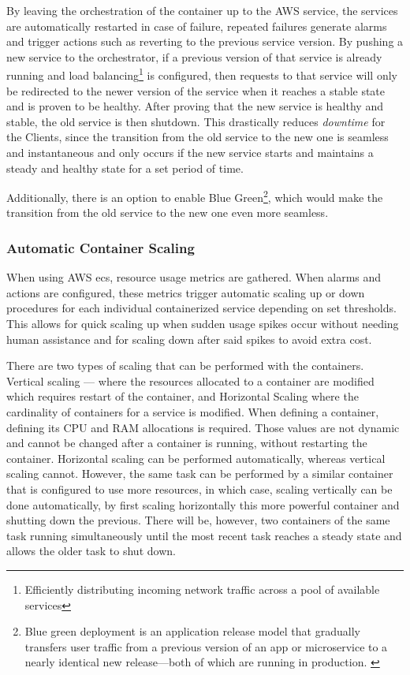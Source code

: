 By leaving the orchestration of the container up to the AWS service, the services are automatically restarted in case of failure, repeated failures generate alarms and trigger actions such as reverting to the previous service version. By pushing a new service to the orchestrator, if a previous version of that service is already running and load balancing\footnote{Efficiently distributing incoming network traffic across a pool of available services\label{foot:load-balancing}} is configured, then requests to that service will only be redirected to the newer version of the service when it reaches a stable state and is proven to be healthy. After proving that the new service is healthy and stable, the old service is then shutdown.
This drastically reduces \textit{downtime} for the Clients, since the transition from the old service to the new one is seamless and instantaneous and only occurs if the new service starts and maintains a steady and healthy state for a set period of time.

Additionally, there is an option to enable Blue Green\footnote{Blue green deployment is an application release model that gradually transfers user traffic from a previous version of an app or microservice to a nearly identical new release—both of which are running in production. \label{foot:blue-green}}, which would make the transition from the old service to the new one even more seamless.

\subsubsection{Automatic Container Scaling}\label{methodology:sss:automatic-container-scaling}

When using AWS \gls{ecs}, resource usage metrics are gathered. When alarms and actions are configured, these metrics trigger automatic scaling up or down procedures for each individual containerized service depending on set thresholds. This allows for quick scaling up when sudden usage spikes occur without needing human assistance and for scaling down after said spikes to avoid extra cost.

There are two types of scaling that can be performed with the containers. Vertical scaling --- where the resources allocated to a container are modified which requires restart of the container, and Horizontal Scaling where the cardinality of containers for a service is modified. When defining a container, defining its CPU and RAM allocations is required. Those values are not dynamic and cannot be changed after a container is running, without restarting the container. Horizontal scaling can be performed automatically, whereas vertical scaling cannot. However, the same task can be performed by a similar container that is configured to use more resources, in which case, scaling vertically can be done automatically, by first scaling horizontally this more powerful container and shutting down the previous. There will be, however, two containers of the same task running simultaneously until the most recent task reaches a steady state and allows the older task to shut down.

